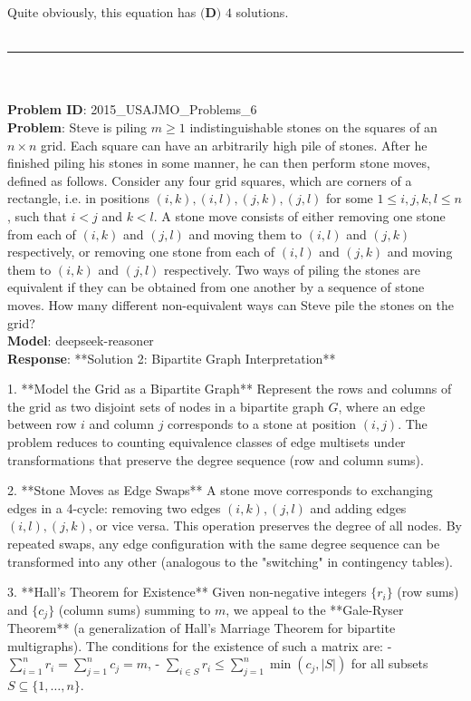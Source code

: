 {Quite obviously, this equation has $\boxed{\textbf{(D) }4}$ solutions. 
 \\
    \vspace{0.3cm} \\
    \hrule \\
    \vspace{0.5cm} \\
    \textbf{Problem ID}: 2015_USAJMO_Problems_6 \\
    \textbf{Problem}: Steve is piling $m\geq 1$ indistinguishable stones on the squares of an $n\times n$ grid. Each square can have an arbitrarily high pile of stones. After he finished piling his stones in some manner, he can then perform stone moves, defined as follows. Consider any four grid squares, which are corners of a rectangle, i.e. in positions $(i, k), (i, l), (j, k), (j, l)$ for some $1\leq i, j, k, l\leq n$, such that $i<j$ and $k<l$. A stone move consists of either removing one stone from each of $(i, k)$ and $(j, l)$ and moving them to $(i, l)$ and $(j, k)$ respectively, or removing one stone from each of $(i, l)$ and $(j, k)$ and moving them to $(i, k)$ and $(j, l)$ respectively.
Two ways of piling the stones are equivalent if they can be obtained from one another by a sequence of stone moves.
How many different non-equivalent ways can Steve pile the stones on the grid? \\
    \textbf{Model}: deepseek-reasoner \\
    \textbf{Response}: **Solution 2: Bipartite Graph Interpretation**

1. **Model the Grid as a Bipartite Graph**  
   Represent the rows and columns of the grid as two disjoint sets of nodes in a bipartite graph \( G \), where an edge between row \( i \) and column \( j \) corresponds to a stone at position \( (i, j) \). The problem reduces to counting equivalence classes of edge multisets under transformations that preserve the degree sequence (row and column sums).

2. **Stone Moves as Edge Swaps**  
   A stone move corresponds to exchanging edges in a 4-cycle: removing two edges \((i, k), (j, l)\) and adding edges \((i, l), (j, k)\), or vice versa. This operation preserves the degree of all nodes. By repeated swaps, any edge configuration with the same degree sequence can be transformed into any other (analogous to the "switching" in contingency tables).

3. **Hall's Theorem for Existence**  
   Given non-negative integers \( \{r_i\} \) (row sums) and \( \{c_j\} \) (column sums) summing to \( m \), we appeal to the **Gale-Ryser Theorem** (a generalization of Hall's Marriage Theorem for bipartite multigraphs). The conditions for the existence of such a matrix are:
   - \( \sum_{i=1}^n r_i = \sum_{j=1}^n c_j = m \),
   - \( \sum_{i \in S} r_i \leq \sum_{j=1}^n \min(c_j, |S|) \) for all subsets \( S \subseteq \{1, \dots, n\} \).

}
